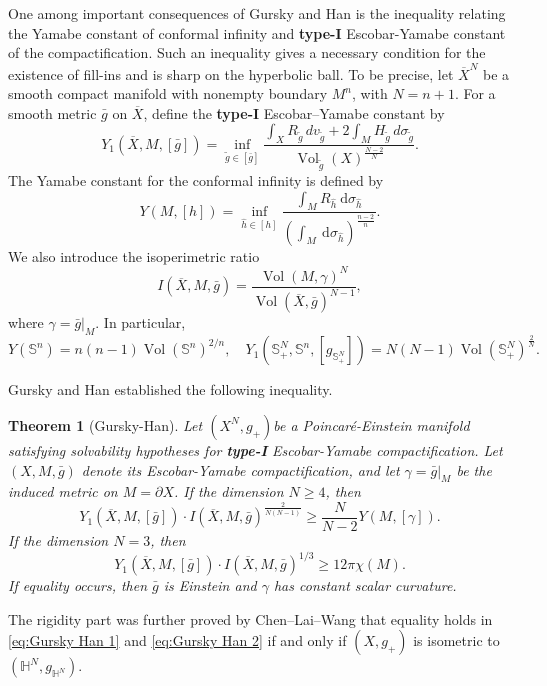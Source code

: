 \documentclass[11pt,letterpaper]{amsart}
\newtheorem{theoremletter}{Theorem}
\theoremstyle{definition}
\theoremstyle{remark}
\numberwithin{equation}{section}
\newcommand{\Sph}{\mathbb S}
\newcommand{\vol}{\operatorname{Vol}}
\newcommand{\wt}{\widetilde}
\newcommand{\barX}{\overline X}
\begin{document}
One among important consequences of Gursky and Han \cite{GurskyHan} is the inequality relating the Yamabe constant of conformal infinity and \textbf{type-I} Escobar-Yamabe constant of the compactification.  Such an inequality gives a necessary condition for the existence of fill-ins and is sharp on the hyperbolic ball. To be precise, let $\barX^N$ be a smooth compact manifold with nonempty boundary $M^n$, with $N=n+1$.  For a smooth metric $\bar g$ on $\barX$, define the \textbf{type-I} Escobar--Yamabe constant by
\begin{equation}\label{eq:Y1-def}
 Y_1(\barX,M,[\bar g])
 =\inf_{\wt g\in[\bar g]}
 \frac{\displaystyle\int_XR_{\wt g}\,dv_{\wt g}+2\int_MH_{\wt g}\,d\sigma_{\wt g}}
 {\vol_{\wt g}(X)^{\frac{N-2}{N}}}.
\end{equation}
The Yamabe constant for the conformal infinity is defined by
\begin{equation}
Y(M,[h])=\inf _{\hat{h} \in[h]} \frac{\int_{M} R_{\hat{h}} \mathrm{~d} \sigma_{\hat{h}}}{\left(\int_{M} \mathrm{~d} \sigma_{\hat{h}}\right)^{\frac{n-2}{n}}}.
\end{equation}
We also introduce the isoperimetric ratio
\begin{equation}
I(\barX, M, \bar{g})=\frac{\operatorname{Vol}(M, \gamma)^{N}}{\operatorname{Vol}(\barX, \bar{g})^{N-1}},
\end{equation}
where $\gamma=\left.\bar{g}\right|_M$. In particular, 
$$Y(\Sph^n)=n(n-1)\vol(\Sph^n)^{2/n},\quad Y_1(\Sph^{N}_+,\Sph^n,[g_{\Sph_+^{N}}])=N(N-1)\vol(\Sph^{N}_+)^{\frac{2}{N}}.$$

 Gursky and Han \cite{GurskyHan} established the following inequality.
\begin{theoremletter}[Gursky-Han]\label{thm:Gursky Han}
Let $\left(X^N, g_{+}\right)$be a Poincaré-Einstein manifold satisfying solvability hypotheses for \textbf{type-I} Escobar-Yamabe compactification. Let $(X, M, \bar{g})$ denote its Escobar-Yamabe compactification, and let $\gamma=\left.\bar{g}\right|_M$ be the induced metric on $M=\partial X$.
If the dimension $N \geq 4$, then
\begin{equation}\label{eq:Gursky Han 1}
Y_1(\barX, M,[\bar{g}]) \cdot I(\barX, M, \bar{g})^{\frac{2}{N(N-1)}} \geq \frac{N}{N-2} Y(M,[\gamma]) .
\end{equation}
If the dimension $N=3$, then
\begin{equation}\label{eq:Gursky Han 2}
Y_1(\barX, M,[\bar{g}]) \cdot I(\barX, M, \bar{g})^{1 / 3} \geq 12 \pi \chi(M). 
\end{equation}
If equality occurs, then $\bar{g}$ is Einstein and $\gamma$ has constant scalar curvature.
\end{theoremletter}
The  rigidity part was further proved by Chen--Lai--Wang
\cite{ChenLaiWang} that equality holds in
\eqref{eq:Gursky Han 1} and \eqref{eq:Gursky Han 2} if and only if
\((X,g_+)\) is isometric to 
\((\mathbb H^N,g_{\mathbb H^N})\).
\end{document}
